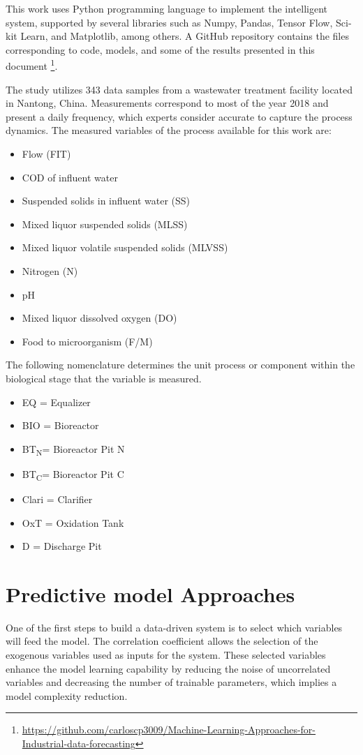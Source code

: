 This work uses Python programming language to implement the intelligent system, supported by several libraries such as Numpy, Pandas, Tensor Flow, Sci-kit Learn, and Matplotlib, among others. A GitHub repository contains the files corresponding to code, models, and some of the results presented in this document \footnote{\url{https://github.com/carloscp3009/Machine-Learning-Approaches-for-Industrial-data-forecasting}}. 

The study utilizes 343 data samples from a wastewater treatment facility located in Nantong, China. Measurements correspond to most of the year 2018 and present a daily frequency, which experts consider accurate to capture the process dynamics. The measured variables of the process available for this work are:

\begin{itemize}
 \item	Flow (FIT)
 \item	COD of influent water
 \item	Suspended solids in influent water (SS)
 \item	Mixed liquor suspended solids (MLSS)
 \item	Mixed liquor volatile suspended solids (MLVSS)
 \item	Nitrogen (N)
 \item	pH
 \item	Mixed liquor dissolved oxygen (DO)
 \item	Food to microorganism (F/M)
\end{itemize}

The following nomenclature determines the unit process or component within the biological stage that the variable is measured.

\begin{itemize}
 \item	EQ = Equalizer
 \item	BIO = Bioreactor
 \item	BT\textsubscript{N}= Bioreactor Pit N
 \item	BT\textsubscript{C}= Bioreactor Pit C
 \item	Clari = Clarifier
 \item	OxT = Oxidation Tank
 \item	D = Discharge Pit
\end{itemize}

\section{Predictive model Approaches}
\label{s:model-design}
One of the first steps to build a data-driven system is to select which variables will feed the model. The correlation coefficient allows the selection of the exogenous variables used as inputs for the system. These selected variables enhance the model learning capability by reducing the noise of uncorrelated variables and decreasing the number of trainable parameters, which implies a model complexity reduction. 

